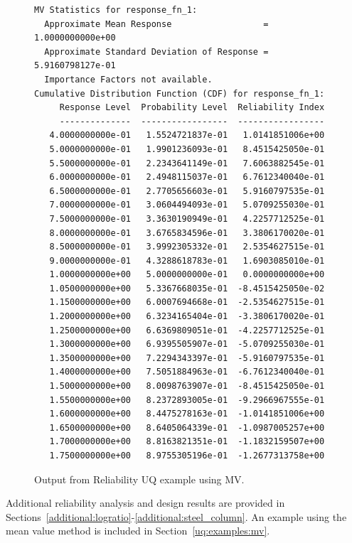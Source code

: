 \begin{figure} %
\begin{bigbox}
\begin{small}
\begin{verbatim}
MV Statistics for response_fn_1:
  Approximate Mean Response                  =  1.0000000000e+00
  Approximate Standard Deviation of Response =  5.9160798127e-01
  Importance Factors not available.
Cumulative Distribution Function (CDF) for response_fn_1:
     Response Level  Probability Level  Reliability Index
     --------------  -----------------  -----------------
   4.0000000000e-01   1.5524721837e-01   1.0141851006e+00
   5.0000000000e-01   1.9901236093e-01   8.4515425050e-01
   5.5000000000e-01   2.2343641149e-01   7.6063882545e-01
   6.0000000000e-01   2.4948115037e-01   6.7612340040e-01
   6.5000000000e-01   2.7705656603e-01   5.9160797535e-01
   7.0000000000e-01   3.0604494093e-01   5.0709255030e-01
   7.5000000000e-01   3.3630190949e-01   4.2257712525e-01
   8.0000000000e-01   3.6765834596e-01   3.3806170020e-01
   8.5000000000e-01   3.9992305332e-01   2.5354627515e-01
   9.0000000000e-01   4.3288618783e-01   1.6903085010e-01
   1.0000000000e+00   5.0000000000e-01   0.0000000000e+00
   1.0500000000e+00   5.3367668035e-01  -8.4515425050e-02
   1.1500000000e+00   6.0007694668e-01  -2.5354627515e-01
   1.2000000000e+00   6.3234165404e-01  -3.3806170020e-01
   1.2500000000e+00   6.6369809051e-01  -4.2257712525e-01
   1.3000000000e+00   6.9395505907e-01  -5.0709255030e-01
   1.3500000000e+00   7.2294343397e-01  -5.9160797535e-01
   1.4000000000e+00   7.5051884963e-01  -6.7612340040e-01
   1.5000000000e+00   8.0098763907e-01  -8.4515425050e-01
   1.5500000000e+00   8.2372893005e-01  -9.2966967555e-01
   1.6000000000e+00   8.4475278163e-01  -1.0141851006e+00
   1.6500000000e+00   8.6405064339e-01  -1.0987005257e+00
   1.7000000000e+00   8.8163821351e-01  -1.1832159507e+00
   1.7500000000e+00   8.9755305196e-01  -1.2677313758e+00
\end{verbatim}
\end{small}
\end{bigbox}
\caption{Output from Reliability UQ example using MV.}
\label{uq:rel_output_mv}
\end{figure}

Additional reliability analysis and design results are provided in 
Sections~\ref{additional:logratio}-\ref{additional:steel_column}.
An example using the mean value method is included in Section~\ref{uq:examples:mv}.

